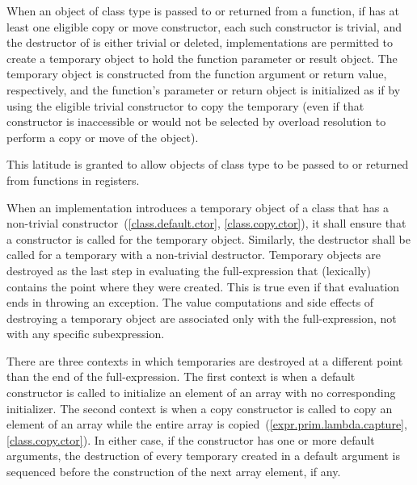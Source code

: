\pnum
When an object of class type 
is passed to or returned from a function,
if  has at least one eligible copy or move constructor,
each such constructor is trivial,
and the destructor of  is either trivial or deleted,
implementations are permitted
to create a temporary object
to hold the function parameter or result object.
The temporary object is constructed
from the function argument or return value, respectively,
and the function's parameter or return object
is initialized as if by
using the eligible trivial constructor to copy the temporary
(even if that constructor is inaccessible
or would not be selected by overload resolution
to perform a copy or move of the object).
\begin{note}
This latitude is granted to allow objects of class type to be passed to or returned from functions in registers.
\end{note}

\pnum
{}%
%
%
When an implementation introduces a temporary object of a class that has a
non-trivial constructor~(\ref{class.default.ctor}, \ref{class.copy.ctor}),
it shall ensure that a constructor is called for the temporary object.
Similarly, the destructor shall be called for a temporary with a non-trivial
destructor.
Temporary objects are destroyed as the last step
in evaluating
the full-expression
that (lexically) contains the point where
they were created.
This is true even if that evaluation ends in throwing an exception.
The
%
value computations and
%
side effects of destroying a temporary object
are associated only with the full-expression, not with any specific
subexpression.

\pnum
{}%
%
There are three contexts in which temporaries are destroyed at a different
point than the end of the full-expression.
The first context is when a default constructor is called to initialize
an element of an array with no corresponding initializer.
The second context is when a copy constructor is called to copy an element of
an array while the entire array is copied~(\ref{expr.prim.lambda.capture}, \ref{class.copy.ctor}).
In either case, if the constructor has one or more default arguments,
the destruction of every temporary created in a default argument is
sequenced before the construction of the next array element, if any.

